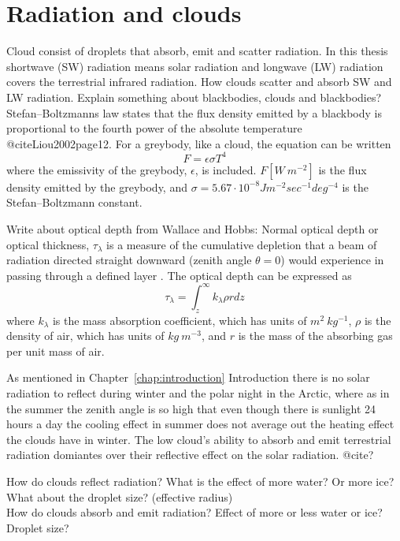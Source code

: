 \section{Radiation and clouds}
Cloud consist of droplets that absorb, emit and scatter radiation. 
In this thesis shortwave (SW) radiation means solar radiation and longwave (LW) radiation covers the terrestrial infrared radiation.
How clouds scatter and absorb SW and LW radiation.
Explain something about blackbodies, clouds and blackbodies? Stefan–Boltzmanns law states that the flux density emitted by a blackbody is proportional to the fourth power of the absolute temperature @citeLiou2002page12. For a greybody, like a cloud, the equation can be written
\begin{equation}
F = \epsilon \sigma T^4
\end{equation}
where the emissivity of the greybody, $\epsilon$, is included. $F [W~m^{-2}]$ is the flux density emitted by the greybody, and $\sigma = 5.67\cdot 10^{-8} Jm^{-2}sec^{-1}deg^{-4}$ is the Stefan–Boltzmann constant.


Write about optical depth from Wallace and Hobbs: Normal optical depth or optical thickness, $\tau_{\lambda}$ is a measure of the cumulative depletion that a beam of radiation directed straight downward (zenith angle $\theta = 0$) would experience in passing through a defined layer \citep{WallaceHobbs2006}. The optical depth can be expressed as
\begin{equation}
\tau_{\lambda} = \int_z^{\infty} k_{\lambda} \rho r dz
\end{equation}
where $k_{\lambda}$ is the mass absorption coefficient, which has units of $m^2~kg^{-1}$, $\rho$ is the density of air, which has units of $kg~m^{-3}$, and $r$ is the mass of the absorbing gas per unit mass of air.


As mentioned in Chapter~\ref{chap:introduction} Introduction there is no solar radiation to reflect during winter and the polar night in the Arctic, where as in the summer the zenith angle is so high that even though there is sunlight 24 hours a day the cooling effect in summer does not average out the heating effect the clouds have in winter. The low cloud's ability to absorb and emit terrestrial radiation domiantes over their reflective effect on the solar radiation. @cite?

How do clouds reflect radiation? What is the effect of more water? Or more ice? What about the droplet size? (effective radius)\\
How do clouds absorb and emit radiation? Effect of more or less water or ice? Droplet size?

